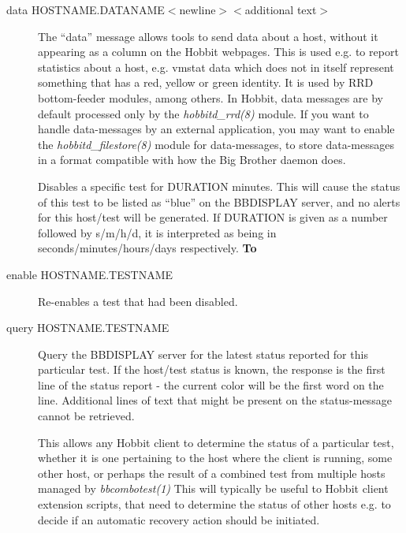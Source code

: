 \begin{description}
 

\item[data HOSTNAME.DATANAME$<$newline$>$$<$additional text$>$] The
 ``data'' message allows tools to send data about a host, without it
 appearing as a column on the Hobbit webpages. This is used e.g. to
 report statistics about a host, e.g. vmstat data which does not in
 itself represent something that has a red, yellow or green
 identity. It is used by RRD bottom-feeder modules, among others. In
 Hobbit, data messages are by default processed only by the
 \emph{hobbitd\_rrd(8)} module. If you want to handle data-messages by
 an external application, you may want to enable the
 \emph{hobbitd\_filestore(8)}  module for data-messages, to store
 data-messages in a format compatible with how the Big Brother daemon
 does. 


 

 Disables a specific test for DURATION minutes. This will cause the
 status of this test to be listed as ``blue'' on the BBDISPLAY server,
 and no alerts for this host/test will be generated. If DURATION is
 given as a number followed by s/m/h/d, it is interpreted as being in
 seconds/minutes/hours/days respectively. \textbf{To} 



\item[enable HOSTNAME.TESTNAME] Re-enables a test that had been disabled. 

 

\item[query HOSTNAME.TESTNAME] Query the BBDISPLAY server for the
  latest status reported for this particular test. If the host/test
  status is known, the response is the first line of the status report
  - the current color will be the first word on the line. Additional
  lines of text that might be present on the status-message cannot be
  retrieved.  

 This allows any Hobbit client to determine the status of a particular
 test, whether it is one pertaining to the host where the client is
 running, some other host, or perhaps the result of a combined test
 from multiple hosts managed by \emph{bbcombotest(1)} This will
 typically be useful to Hobbit client extension scripts, that need to
 determine the status of other hosts e.g. to decide if an automatic
 recovery action should be initiated. 



\end{description}
